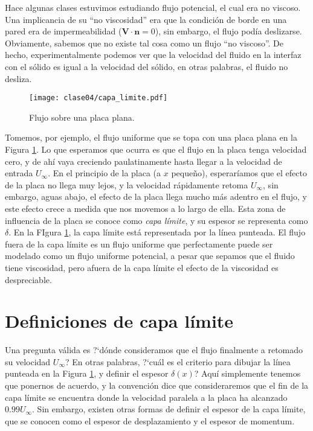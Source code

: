 Hace algunas clases estuvimos estudiando flujo potencial, el cual era no viscoso.
Una implicancia de su ``no viscosidad'' era que la condición de borde en una pared era de impermeabilidad ($\mathbf{V}\cdot\mathbf{n}=0$), sin embargo, el flujo podía deslizarse.
Obviamente, sabemos que no existe tal cosa como un flujo ``no viscoso''. 
De hecho, experimentalmente podemos ver que la velocidad del fluido en la interfaz con el sólido es igual a la velocidad del sólido, en otras palabras, el fluido no desliza.
%
\begin{figure}[!h]
\centering
\texttt{[image: clase04/capa\_limite.pdf]}
\caption{Flujo sobre una placa plana.}
\label{fig:capa_limite}
\end{figure}
%
Tomemos, por ejemplo, el flujo uniforme que se topa con una placa plana en la Figura \ref{fig:capa_limite}.
Lo que esperamos que ocurra es que el flujo en la placa tenga velocidad cero, y de ahí vaya creciendo paulatinamente hasta llegar a la velocidad de entrada $U_\infty$.
En el principio de la placa (a $x$ pequeño), esperaríamos que el efecto de la placa no llega muy lejos, y la velocidad rápidamente retoma $U_\infty$, sin embargo, aguas abajo, el efecto de la placa llega mucho más adentro en el flujo, y este efecto crece a medida que nos movemos a lo largo de ella.
Esta zona de influencia de la placa se conoce como \emph{capa límite}, y su espesor se representa como $\delta$.
En la FIgura \ref{fig:capa_limite}, la capa límite está representada por la línea punteada.
El flujo fuera de la capa límite es un flujo uniforme que perfectamente puede ser modelado como un flujo uniforme potencial, a pesar que sepamos que el fluido tiene viscosidad, pero afuera de la capa límite el efecto de la viscosidad es despreciable.

\section*{Definiciones de capa límite}
Una pregunta válida es \mbox{?`}dónde consideramos que el flujo finalmente a retomado su velocidad $U_\infty$? 
En otras palabras, \mbox{?`}cuál es el criterio para dibujar la línea punteada en la Figura \ref{fig:capa_limite}, y definir el espesor $\delta(x)$?
Aquí simplemente tenemos que ponernos de acuerdo, y la convención dice que consideraremos que el fin de la capa límite se encuentra donde la velocidad paralela a la placa ha alcanzado $0.99U_\infty$.
Sin embargo, existen otras formas de definir el espesor de la capa límite, que se conocen como el espesor de desplazamiento y el espesor de momentum.

